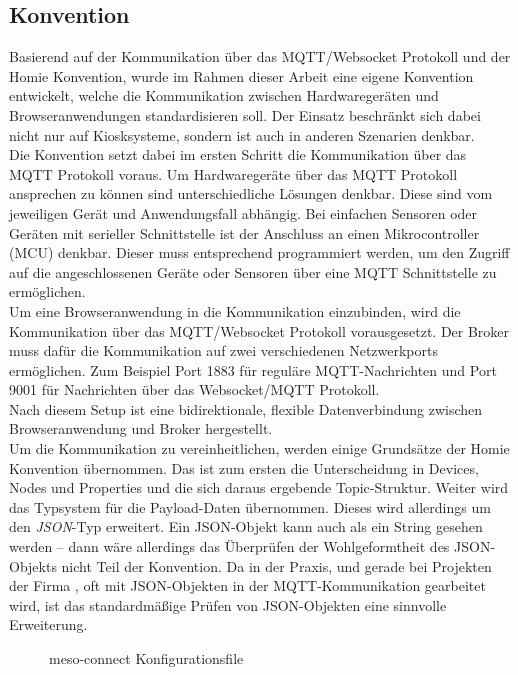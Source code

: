 \subsection{Konvention}
\label{subs:konvention}

Basierend auf der Kommunikation über das MQTT/Websocket Protokoll und der Homie Konvention,
wurde im Rahmen dieser Arbeit eine eigene Konvention entwickelt, welche die Kommunikation
zwischen Hardwaregeräten und Browseranwendungen standardisieren soll. Der Einsatz beschränkt
sich dabei nicht nur auf Kiosksysteme, sondern ist auch in anderen Szenarien denkbar.\\

Die Konvention setzt dabei im ersten Schritt die Kommunikation über das MQTT Protokoll voraus.
Um Hardwaregeräte über das MQTT Protokoll ansprechen zu können sind unterschiedliche Lösungen 
denkbar. Diese sind vom jeweiligen Gerät und Anwendungsfall abhängig. Bei einfachen Sensoren oder
Geräten mit serieller Schnittstelle ist der Anschluss an einen Mikrocontroller (MCU) denkbar.
Dieser muss entsprechend programmiert werden, um den Zugriff auf die angeschlossenen Geräte 
oder Sensoren über eine MQTT Schnittstelle zu ermöglichen.\\
Um eine Browseranwendung in die Kommunikation einzubinden, wird die Kommunikation über das MQTT/Websocket
Protokoll vorausgesetzt. Der Broker muss dafür die Kommunikation auf zwei verschiedenen 
Netzwerkports ermöglichen. Zum Beispiel Port 1883 für reguläre MQTT-Nachrichten und Port 9001
für Nachrichten über das Websocket/MQTT Protokoll.\\
Nach diesem Setup ist eine bidirektionale, flexible Datenverbindung zwischen Browseranwendung
und Broker hergestellt.\\

Um die Kommunikation zu vereinheitlichen, werden einige Grundsätze der Homie Konvention übernommen.
Das ist zum ersten die Unterscheidung in Devices, Nodes und Properties und die sich daraus 
ergebende Topic-Struktur. Weiter wird das Typsystem für die Payload-Daten übernommen. 
Dieses wird allerdings um den \emph{JSON}-Typ erweitert. 
Ein JSON-Objekt kann auch als ein String gesehen werden -- dann wäre allerdings
das Überprüfen der Wohlgeformtheit des JSON-Objekts nicht Teil der Konvention.
Da in der Praxis, und gerade bei Projekten der Firma \meso{}, oft mit JSON-Objekten in der 
MQTT-Kommunikation gearbeitet wird, ist das standardmäßige Prüfen von JSON-Objekten eine
sinnvolle Erweiterung.

\begin{figure}
  
  \caption{meso-connect Konfigurationsfile}
  \label{fig:meso-connect-config-blueprint}
\end{figure}

